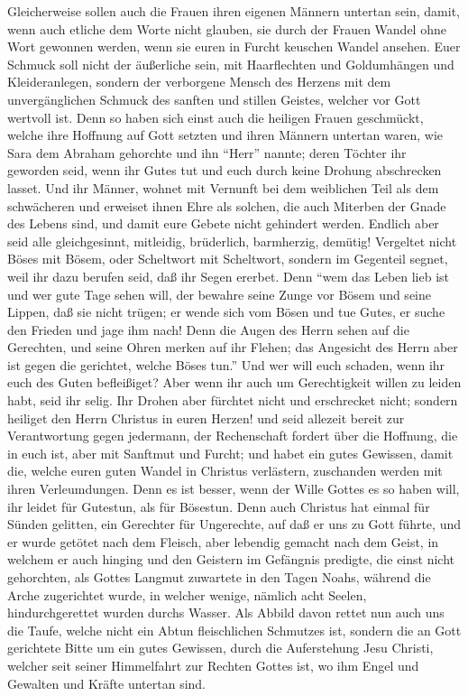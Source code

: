  Gleicherweise sollen auch die Frauen ihren eigenen
Männern untertan sein, damit, wenn auch etliche dem Worte nicht glauben,
sie durch der Frauen Wandel ohne Wort gewonnen werden, 
wenn sie euren in Furcht keuschen Wandel ansehen.  Euer
Schmuck soll nicht der äußerliche sein, mit Haarflechten und
Goldumhängen und Kleideranlegen,  sondern der verborgene
Mensch des Herzens mit dem unvergänglichen Schmuck des sanften und
stillen Geistes, welcher vor Gott wertvoll ist.  Denn so
haben sich einst auch die heiligen Frauen geschmückt, welche ihre
Hoffnung auf Gott setzten und ihren Männern untertan waren,
 wie Sara dem Abraham gehorchte und ihn ``Herr'' nannte;
deren Töchter ihr geworden seid, wenn ihr Gutes tut und euch durch keine
Drohung abschrecken lasset.  Und ihr Männer, wohnet mit
Vernunft bei dem weiblichen Teil als dem schwächeren und erweiset ihnen
Ehre als solchen, die auch Miterben der Gnade des Lebens sind, und damit
eure Gebete nicht gehindert werden.  Endlich aber seid
alle gleichgesinnt, mitleidig, brüderlich, barmherzig, demütig!
 Vergeltet nicht Böses mit Bösem, oder Scheltwort mit
Scheltwort, sondern im Gegenteil segnet, weil ihr dazu berufen seid, daß
ihr Segen ererbet.  Denn ``wem das Leben lieb ist und wer
gute Tage sehen will, der bewahre seine Zunge vor Bösem und seine
Lippen, daß sie nicht trügen;  er wende sich vom Bösen
und tue Gutes, er suche den Frieden und jage ihm nach! 
Denn die Augen des Herrn sehen auf die Gerechten, und seine Ohren merken
auf ihr Flehen; das Angesicht des Herrn aber ist gegen die gerichtet,
welche Böses tun.''  Und wer will euch schaden, wenn ihr
euch des Guten befleißiget?  Aber wenn ihr auch um
Gerechtigkeit willen zu leiden habt, seid ihr selig. Ihr Drohen aber
fürchtet nicht und erschrecket nicht; sondern heiliget den Herrn
Christus in euren Herzen!  und seid allezeit bereit zur
Verantwortung gegen jedermann, der Rechenschaft fordert über die
Hoffnung, die in euch ist,  aber mit Sanftmut und Furcht;
und habet ein gutes Gewissen, damit die, welche euren guten Wandel in
Christus verlästern, zuschanden werden mit ihren Verleumdungen.
 Denn es ist besser, wenn der Wille Gottes es so haben
will, ihr leidet für Gutestun, als für Bösestun.  Denn
auch Christus hat einmal für Sünden gelitten, ein Gerechter für
Ungerechte, auf daß er uns zu Gott führte, und er wurde getötet nach dem
Fleisch, aber lebendig gemacht nach dem Geist,  in
welchem er auch hinging und den Geistern im Gefängnis predigte,
 die einst nicht gehorchten, als Gottes Langmut zuwartete
in den Tagen Noahs, während die Arche zugerichtet wurde, in welcher
wenige, nämlich acht Seelen, hindurchgerettet wurden durchs Wasser.
 Als Abbild davon rettet nun auch uns die Taufe, welche
nicht ein Abtun fleischlichen Schmutzes ist, sondern die an Gott
gerichtete Bitte um ein gutes Gewissen, durch die Auferstehung Jesu
Christi,  welcher seit seiner Himmelfahrt zur Rechten
Gottes ist, wo ihm Engel und Gewalten und Kräfte untertan sind.

